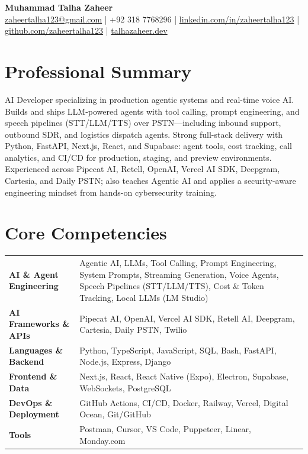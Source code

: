 \documentclass[11pt,a4paper]{article}
\begin{document}
\begin{center}
  {\LARGE \textbf{Muhammad Talha Zaheer}} \\[6pt]
  \href{mailto:zaheertalha123@gmail.com}{zaheertalha123@gmail.com} \;|\;
  +92 318 7768296 \;|\;
  \href{https://www.linkedin.com/in/zaheertalha123}{linkedin.com/in/zaheertalha123} \;|\;
  \href{https://github.com/zaheertalha123}{github.com/zaheertalha123} \;|\;
  \href{https://talhazaheer.dev}{talhazaheer.dev}
\end{center}

\vspace{4pt}

\section{Professional Summary}
AI Developer specializing in production agentic systems and real-time voice AI. Builds and ships LLM-powered agents with tool calling, prompt engineering, and speech pipelines (STT/LLM/TTS) over PSTN---including inbound support, outbound SDR, and logistics dispatch agents. Strong full-stack delivery with Python, FastAPI, Next.js, React, and Supabase: agent tools, cost tracking, call analytics, and CI/CD for production, staging, and preview environments. Experienced across Pipecat AI, Retell, OpenAI, Vercel AI SDK, Deepgram, Cartesia, and Daily PSTN; also teaches Agentic AI and applies a security-aware engineering mindset from hands-on cybersecurity training.

\section{Core Competencies}
\begin{tabularx}{\textwidth}{@{}>{\bfseries}p{1.75in} X@{}}
  AI \& Agent Engineering &
  Agentic AI, LLMs, Tool Calling, Prompt Engineering, System Prompts, Streaming Generation, Voice Agents, Speech Pipelines (STT/LLM/TTS), Cost \& Token Tracking, Local LLMs (LM Studio) \\
  AI Frameworks \& APIs &
  Pipecat AI, OpenAI, Vercel AI SDK, Retell AI, Deepgram, Cartesia, Daily PSTN, Twilio \\
  Languages \& Backend &
  Python, TypeScript, JavaScript, SQL, Bash, FastAPI, Node.js, Express, Django \\
  Frontend \& Data &
  Next.js, React, React Native (Expo), Electron, Supabase, WebSockets, PostgreSQL \\
  DevOps \& Deployment &
  GitHub Actions, CI/CD, Docker, Railway, Vercel, Digital Ocean, Git/GitHub \\
  Tools &
  Postman, Cursor, VS Code, Puppeteer, Linear, Monday.com \\
\end{tabularx}
\end{document}
